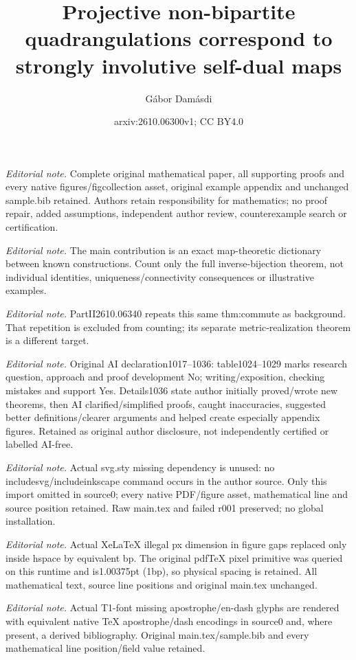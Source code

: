 \documentclass[10pt,a4paper]{article}
\title{Projective non-bipartite quadrangulations correspond to strongly involutive self-dual maps}
\author{Gábor Damásdi}
\date{arxiv:2610.06300v1; CC BY4.0}
\begin{document}
\maketitle
\noindent\textit{Editorial note.} Complete original mathematical paper, all supporting proofs and every native figures/figcollection asset, original example appendix and unchanged sample.bib retained. Authors retain responsibility for mathematics; no proof repair, added assumptions, independent author review, counterexample search or certification.\par\medskip
\noindent\textit{Editorial note.} The main contribution is an exact map-theoretic dictionary between known constructions. Count only the full inverse-bijection theorem, not individual identities, uniqueness/connectivity consequences or illustrative examples.\par\medskip
\noindent\textit{Editorial note.} PartII2610.06340 repeats this same thm:commute as background. That repetition is excluded from counting; its separate metric-realization theorem is a different target.\par\medskip
\noindent\textit{Editorial note.} Original AI declaration1017--1036: table1024--1029 marks research question, approach and proof development No; writing/exposition, checking mistakes and support Yes. Details1036 state author initially proved/wrote new theorems, then AI clarified/simplified proofs, caught inaccuracies, suggested better definitions/clearer arguments and helped create especially appendix figures. Retained as original author disclosure, not independently certified or labelled AI-free.\par\medskip
\noindent\textit{Editorial note.} Actual svg.sty missing dependency is unused: no includesvg/includeinkscape command occurs in the author source. Only this import omitted in source0; every native PDF/figure asset, mathematical line and source position retained. Raw main.tex and failed r001 preserved; no global installation.\par\medskip
\noindent\textit{Editorial note.} Actual XeLaTeX illegal px dimension in figure gaps replaced only inside hspace by equivalent bp. The original pdfTeX pixel primitive was queried on this runtime and is1.00375pt (1bp), so physical spacing is retained. All mathematical text, source line positions and original main.tex unchanged.\par\medskip
\noindent\textit{Editorial note.} Actual T1-font missing apostrophe/en-dash glyphs are rendered with equivalent native TeX apostrophe/dash encodings in source0 and, where present, a derived bibliography. Original main.tex/sample.bib and every mathematical line position/field value retained.\par\medskip
\end{document}
